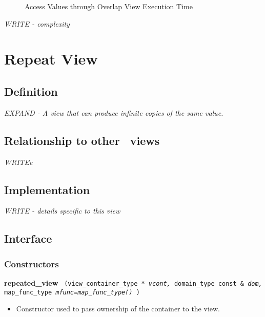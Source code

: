 \begin{figure}[p]
\caption{Access Values through Overlap View Execution Time}
\label{fig:over-vw-access-exper}
\end{figure}

\emph{WRITE - complexity}


\section{Repeat View} \label{sec-rep-vw}

\subsection{Definition}

\textit{EXPAND - A view that can produce infinite copies of the same value.}

\subsection{Relationship to other \stapl\ views}

\textit{WRITEe}

\subsection{Implementation}

\textit{WRITE - details specific to this view}

\subsection{Interface} \label{sec-rep-vw-inter}

\subsubsection{Constructors}

\noindent
\textbf{repeated\_view}%
\texttt{%
(view\_container\_type *
\textit{vcont,}%
domain\_type const \&
\textit{dom,}%
map\_func\_type
\textit{mfunc=map\_func\_type()}%
)
}

\begin{itemize}
\item
Constructor used to pass ownership of the container to the view.
\end{itemize}

